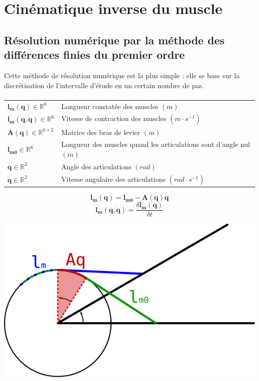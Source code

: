 \documentclass[pdftex,a4paper,11pt]{report}
\newcommand{\vs}[1]{\boldsymbol{#1}} %
\newcommand{\ms}[1]{\boldsymbol{#1}} %
\numberwithin{equation}{subsection}
\begin{document}

\section{Cinématique inverse du muscle}

\subsection{Résolution numérique par la méthode des différences finies du premier ordre}

Cette méthode de résolution numérique est la plus simple : elle se base sur la discrétisation de l'intervalle d'étude en un certain nombre de pas.

\paragraph{}
\begin{small}
\begin{tabular}{ll}
    $\vs{l_m}(\vs{q}) \in \mathbb{R}^6$                  & Longueur constatée des muscles $(m)$ \\
    $\vs{\dot{l_m}}(\vs{q}, \vs{\dot{q}}) \in \mathbb{R}^6$   & Vitesse de contraction des muscles $(m \cdot s^{-1})$ \\

    $\ms{A}(\vs{q}) \in \mathbb{R}^{6 \times 2}$   &  Matrice des bras de levier $(m)$\\
    $\vs{l_{m0}} \in \mathbb{R}^6$            &  Longueur des muscles quand les articulations sont d'angle nul $(m)$ \\
    $\vs{q} \in \mathbb{R}^2$                 &  Angle des articulations $(rad)$ \\
    $\vs{\dot{q}} \in \mathbb{R}^2$           &  Vitesse angulaire des articulations $(rad \cdot s^{-1})$ \\
\end{tabular}
\end{small}

\[\vs{l_m}(\vs{q}) = \vs{l_{m0}} - \ms{A}(\vs{q}) \vs{q}\]
\[\vs{\dot{l_m}}(\vs{q}, \vs{\dot{q}}) = \frac{\delta \vs{l_m}(\vs{q})}{\delta t}\]

\begin{center}
        \includegraphics[width=.50\linewidth]{fig/muscle_length}
\end{center}
\end{document}

